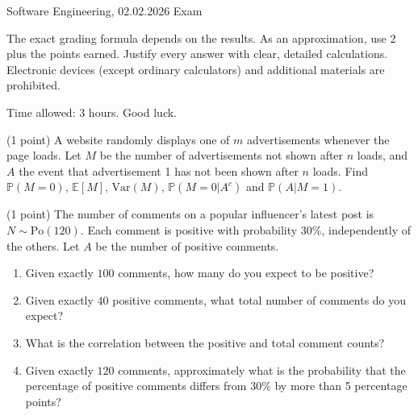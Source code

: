 \documentclass[a4paper]{report}
\begin{document}
\noindent Software Engineering, 02.02.2026 \hfill Exam

\hrulefill

\begin{it}
The exact grading formula depends on the results. As an approximation, use 2 plus the points earned. Justify every answer with clear, detailed calculations. Electronic devices (except ordinary calculators) and additional materials are prohibited.

Time allowed: 3 hours. Good luck.





\end{it}

\vspace{0.6cm}

\begin{problem} (1 point)
A website randomly displays one of $m$ advertisements whenever the page loads. Let $M$ be the number of advertisements not shown after $n$ loads, and $A$ the event that advertisement 1 has not been shown after $n$ loads. Find $\mathbb P(M=0)$, $\mathbb E[M]$, $\mbox{Var}(M)$, $\mathbb P(M=0|A^c)$ and $\mathbb P(A|M=1)$.
\end{problem}

\vspace{0.2cm}

\begin{problem} (1 point) The number of comments on a popular influencer's latest post is $N\sim\mbox{Po}(120)$. Each comment is positive with probability $30\%$, independently of the others. Let $A$ be the number of positive comments.
\begin{enumerate}
    \item Given exactly $100$ comments, how many do you expect to be positive?
    \item Given exactly $40$ positive comments, what total number of comments do you expect?
    \item What is the correlation between the positive and total comment counts?
    \item Given exactly $120$ comments, approximately what is the probability that the percentage of positive comments differs from 30\% by more than 5 percentage points?
\end{enumerate}
\end{problem}

\vspace{0.2cm}
\end{document}
